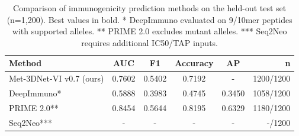 \begin{table}
\caption{Comparison of immunogenicity prediction methods on the held-out test set (n=1,200). Best values in bold. * DeepImmuno evaluated on 9/10mer peptides with supported alleles. ** PRIME 2.0 excludes mutant alleles. *** Seq2Neo requires additional IC50/TAP inputs.}
\label{tab:table3_comparison}
\begin{tabular}{lccccr}
\toprule
Method & AUC & F1 & Accuracy & AP & n \\
\midrule
Met-3DNet-VI v0.7 (ours) & 0.7602 & 0.5402 & 0.7192 & - & 1200/1200 \\
DeepImmuno* & 0.5888 & 0.3983 & 0.4745 & 0.3450 & 1058/1200 \\
PRIME 2.0** & 0.8454 & 0.5644 & 0.8195 & 0.6329 & 1180/1200 \\
Seq2Neo*** & - & - & - & - & -/1200 \\
\bottomrule
\end{tabular}
\end{table}
